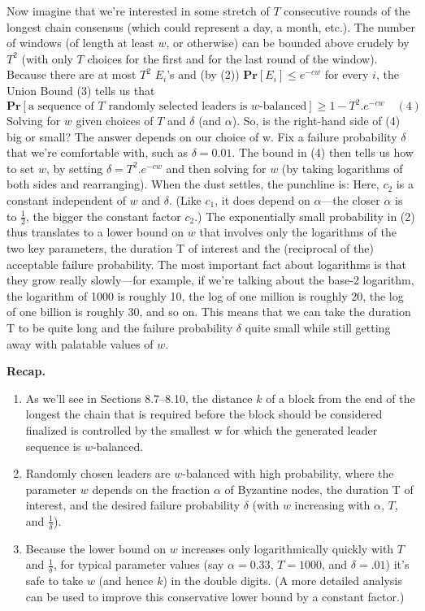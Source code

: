 Now imagine that we’re interested in some stretch of $T$ consecutive rounds of the longest chain consensus (which could represent a day, a month, etc.). The number of windows (of
length at least $w$, or otherwise) can be bounded above crudely by $T^2$ (with only $T$ choices
for the first and for the last round of the window). Because there are at most $T^2$ $E_i$’s and
(by (2)) $\textbf{Pr}[E_i] \leq e^{-cw}$ for every $i$, the Union Bound (3) tells us that
$$\textbf{Pr}[\text{a sequence of $T$ randomly selected leaders is $w$-balanced}] \geq 1 - T^2. e^{-cw} \quad(4)$$
Solving for $w$ given choices of $T$ and $\delta$ (and $\alpha$). So, is the right-hand side of (4) big
or small? The answer depends on our choice of w. Fix a failure probability $\delta$ that we’re
comfortable with, such as $\delta = 0.01$. The bound in (4) then tells us how to set $w$, by setting
$\delta = T^2 . e^{-cw}$ and then solving for $w$ (by taking logarithms of both sides and rearranging).
When the dust settles, the punchline is:
Here, $c_2$ is a constant independent of $w$ and $\delta$. (Like $c_1$, it does depend on $\alpha$—the closer $\alpha$
is to $\frac{1}{2}$, the bigger the constant factor $c_2$.)
The exponentially small probability in (2) thus translates to a lower bound on $w$ that
involves only the logarithms of the two key parameters, the duration T of interest and the
(reciprocal of the) acceptable failure probability. The most important fact about logarithms
is that they grow really slowly—for example, if we’re talking about the base-2 logarithm, the
logarithm of 1000 is roughly 10, the log of one million is roughly 20, the log of one billion
is roughly 30, and so on. This means that we can take the duration T to be quite long and
the failure probability $\delta$ quite small while still getting away with palatable values of $w$.


\noindent\textbf{Recap.}
\begin{enumerate}
    \item As we’ll see in Sections 8.7–8.10, the distance $k$ of a block from the end of the longest
the chain that is required before the block should be considered finalized is controlled by
the smallest w for which the generated leader sequence is $w$-balanced.
    \item Randomly chosen leaders are $w$-balanced with high probability, where the parameter $w$
depends on the fraction $\alpha$ of Byzantine nodes, the duration T of interest, and the
desired failure probability $\delta$ (with $w$ increasing with $\alpha$, $T$, and $\frac{1}{\delta}$).
    \item Because the lower bound on $w$ increases only logarithmically quickly with $T$ and $\frac{1}{\delta}$,
for typical parameter values (say $\alpha = 0.33$, $T = 1000$, and $\delta = .01$) it’s safe to take $w$
(and hence $k$) in the double digits. (A more detailed analysis can be used to improve
this conservative lower bound by a constant factor.)
\end{enumerate}

